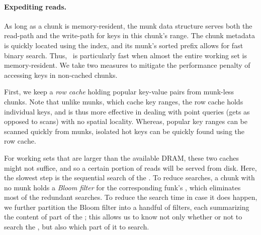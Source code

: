 \paragraph{Expediting reads.}
As long as a chunk  is memory-resident, the munk data structure serves both the read-path and the write-path for keys 
in this chunk's range. The chunk metadata is quickly located using the index, and its munk's sorted prefix allows for fast 
binary search. Thus, \sys\ is particularly fast when almost the entire working set is memory-resident. 
We take two measures to mitigate the performance penalty of accessing keys in non-cached chunks.

First, we keep a \emph{row cache} holding popular key-value pairs from munk-less chunks. Note that unlike munks, which cache key ranges, the row
cache holds individual keys, and is thus more effective in dealing with point queries (gets as opposed to scans) with no
spatial locality.
Whereas, popular key ranges %
can be scanned quickly from munks, 
isolated hot keys %
can be quickly found using the row cache.

For working sets that are  larger than the available DRAM, these two caches might not suffice, and so a certain portion of reads 
will be served from disk. Here, the slowest step is the sequential search of the . 
To reduce  searches, a chunk with no munk holds a \emph{Bloom filter} for the corresponding funk's , 
which eliminates most of the redundant   searches.
To reduce the  search time in case it does happen, 
we further  partition the Bloom filter into a  handful of filters, each summarizing the 
content of part of the ; this allows us to know not only whether or not to search the 
, but also which part of it to search.  
 
